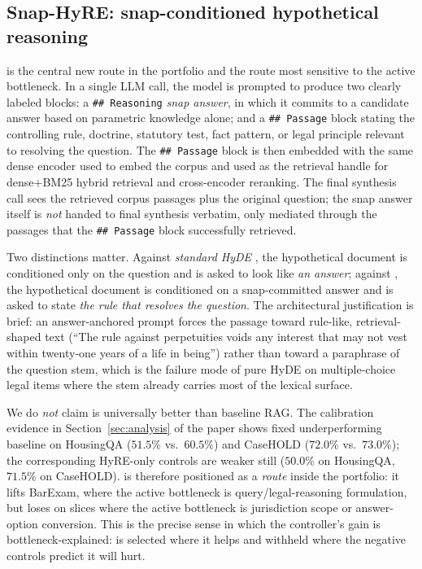 \subsection{Snap-HyRE: snap-conditioned hypothetical reasoning}\label{sec:method:snaphyre}

\hyre{} is the central new route in the portfolio and the route most
sensitive to the active bottleneck. In a single LLM call, the model is
prompted to produce two clearly labeled blocks: a \texttt{\#\#~Reasoning}
\emph{snap answer}, in which it commits to a candidate answer based on
parametric knowledge alone; and a \texttt{\#\#~Passage} block stating the
controlling rule, doctrine, statutory test, fact pattern, or legal
principle relevant to resolving the question. The \texttt{\#\#~Passage}
block is then embedded with the same dense encoder used to embed the
corpus and used as the retrieval handle for dense+BM25 hybrid retrieval
and cross-encoder reranking. The final synthesis call sees the retrieved
corpus passages plus the original question; the snap answer itself is
\emph{not} handed to final synthesis verbatim, only mediated through the
passages that the \texttt{\#\#~Passage} block successfully retrieved.

Two distinctions matter. Against \emph{standard HyDE}
\citep{gao2023hyde}, the hypothetical document is conditioned only on the
question and is asked to look like \emph{an answer}; against \hyre{}, the
hypothetical document is conditioned on a snap-committed answer and is
asked to state \emph{the rule that resolves the question}. The
architectural justification is brief: an answer-anchored prompt forces
the passage toward rule-like, retrieval-shaped text (``The rule against
perpetuities voids any interest that may not vest within twenty-one years
of a life in being'') rather than toward a paraphrase of the question
stem, which is the failure mode of pure HyDE on multiple-choice legal
items where the stem already carries most of the lexical surface.

We do \emph{not} claim \hyre{} is universally better than baseline RAG.
The calibration evidence in Section~\ref{sec:analysis} of the paper shows fixed \hyre{} underperforming
baseline on HousingQA ($51.5\%$ vs.\ $60.5\%$) and CaseHOLD ($72.0\%$
vs.\ $73.0\%$); the corresponding HyRE-only controls are weaker still
($50.0\%$ on HousingQA, $71.5\%$ on CaseHOLD). \hyre{} is therefore
positioned as a \emph{route} inside the portfolio: it lifts BarExam,
where the active bottleneck is query/legal-reasoning formulation, but
loses on slices where the active bottleneck is jurisdiction scope or
answer-option conversion. This is the precise sense in which the
controller's gain is bottleneck-explained: \hyre{} is selected where it
helps and withheld where the negative controls predict it will hurt.


